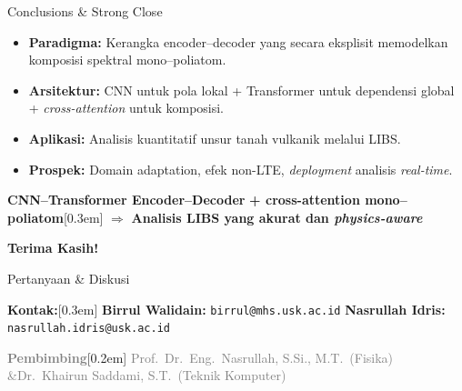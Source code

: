 \documentclass{beamer}
\def\\{}%
\begin{document}
\begin{frame}{Conclusions \& Strong Close}
  \begin{itemize}\setlength{\itemsep}{3pt}
    \item \textbf{Paradigma:} Kerangka encoder--decoder yang secara eksplisit memodelkan komposisi spektral mono--poliatom.
    \item \textbf{Arsitektur:} CNN untuk pola lokal + Transformer untuk dependensi global + \textit{cross-attention} untuk komposisi.
    \item \textbf{Aplikasi:} Analisis kuantitatif unsur tanah vulkanik melalui LIBS.
    \item \textbf{Prospek:} Domain adaptation, efek non-LTE, \textit{deployment} analisis \textit{real-time}.
  \end{itemize}
  \vspace{0.8em}
  \centering
  \Large \textbf{CNN--Transformer Encoder--Decoder}\\
  \large \textbf{+ cross-attention mono--poliatom}\\[0.3em]
  \large $\Rightarrow$ \textbf{Analisis LIBS yang akurat dan \textit{physics-aware}}
\end{frame}

\begin{frame}{}
  \centering
  \vspace{0.5em}
  {\Huge \textcolor{uskGold}{\textbf{Terima Kasih!}}}

  \vspace{0.6em}
  {\Large Pertanyaan \& Diskusi}

  \vspace{1.0em}
  {\large \textcolor{uskGold}{\textbf{Kontak:}}}\\[0.3em]
  {\small
    \textbf{Birrul Walidain:} \texttt{birrul@mhs.usk.ac.id}\\
    \textbf{Nasrullah Idris:} \texttt{nasrullah.idris@usk.ac.id}
  }

  \vfill
  {\footnotesize \textcolor{gray}{\textbf{Pembimbing}}}\\[0.2em]
  {\scriptsize \textcolor{gray}{Prof.\ Dr.\ Eng.\ Nasrullah, S.Si., M.T.\ (Fisika) \quad\&\quad Dr.\ Khairun Saddami, S.T.\ (Teknik Komputer)}}
\end{frame}
\end{document}
